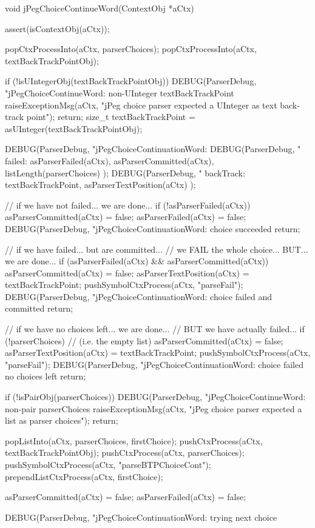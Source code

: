\startCCode
void jPegChoiceContinueWord(ContextObj *aCtx) {
  assert(isContextObj(aCtx));
  
  popCtxProcessInto(aCtx, parserChoices);
  popCtxProcessInto(aCtx, textBackTrackPointObj);
  
  if (!isUIntegerObj(textBackTrackPointObj)) {
    DEBUG(ParserDebug,
      "jPegChoiceContinueWord: non-UInteger textBackTrackPoint%
    raiseExceptionMsg(aCtx,
      "jPeg choice parser expected a UInteger as text back-track point");
    return;
  }
  size_t textBackTrackPoint = asUInteger(textBackTrackPointObj);
  
  DEBUG(ParserDebug,
    "jPegChoiceContinuationWord:%
  DEBUG(ParserDebug,
    "  failed: %
    asParserFailed(aCtx), asParserCommitted(aCtx),
    listLength(parserChoices)
  );
  DEBUG(ParserDebug,
    "  backTrack: %
    textBackTrackPoint, asParserTextPosition(aCtx)
  );
  
  // if we have not failed... we are done...
  if (!asParserFailed(aCtx)) {
    asParserCommitted(aCtx) = false;
    asParserFailed(aCtx)    = false;
    DEBUG(ParserDebug, "jPegChoiceContinuationWord: choice succeeded%
    return;
  }

  // if we have failed... but are committed... 
  // we FAIL the whole choice... BUT... we are done...
  if (asParserFailed(aCtx) && asParserCommitted(aCtx)) {
    asParserCommitted(aCtx)    = false;
    asParserTextPosition(aCtx) = textBackTrackPoint;
    pushSymbolCtxProcess(aCtx, "parseFail");
    DEBUG(ParserDebug, "jPegChoiceContinuationWord: choice failed and committed%
    return;
  }

  // if we have no choices left... we are done...
  // BUT we have actually failed...
  if (!parserChoices) {    // (i.e. the empty list)
    asParserCommitted(aCtx)    = false;
    asParserTextPosition(aCtx) = textBackTrackPoint;
    pushSymbolCtxProcess(aCtx, "parseFail");
    DEBUG(ParserDebug, "jPegChoiceContinuationWord: choice failed no choices left%
    return;
  }

  if (!isPairObj(parserChoices)) {
    DEBUG(ParserDebug,
      "jPegChoiceContinueWord: non-pair parserChoices%
    raiseExceptionMsg(aCtx,
      "jPeg choice parser expected a list as parser choices");
    return;
  }

  popListInto(aCtx, parserChoices, firstChoice);
  pushCtxProcess(aCtx, textBackTrackPointObj);
  pushCtxProcess(aCtx, parserChoices);
  pushSymbolCtxProcess(aCtx, "parseBTPChoiceCont");
  prependListCtxProcess(aCtx, firstChoice);
  
  asParserCommitted(aCtx) = false;
  asParserFailed(aCtx)    = false;
  
  DEBUG(ParserDebug, "jPegChoiceContinuationWord: trying next choice%
}
\stopCCode

